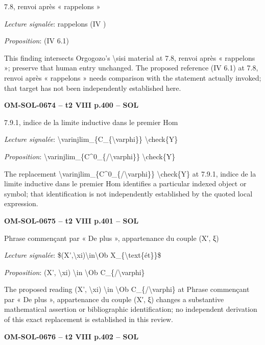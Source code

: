 7.8, renvoi après « rappelons »\par
\emph{Lecture signalée}: rappelons (IV )\par
\emph{Proposition}: (IV 6.1)\par
This finding intersects Orgogozo's \textbackslash{}sisi material at 7.8, renvoi après « rappelons »; preserve that human entry unchanged. The proposed reference (IV 6.1) at 7.8, renvoi après « rappelons » needs comparison with the statement actually invoked; that target has not been independently established here.\par
\par\noindent\textbf{OM-SOL-0674 -- t2 VIII p.400 -- SOL}\par
7.9.1, indice de la limite inductive dans le premier Hom\par
\emph{Lecture signalée}: \textbackslash{}varinjlim\_\{C\_\{\textbackslash{}varphi\}\} \textbackslash{}check\{Y\}\par
\emph{Proposition}: \textbackslash{}varinjlim\_\{C\textasciicircum{}0\_\{/\textbackslash{}varphi\}\} \textbackslash{}check\{Y\}\par
The replacement \textbackslash{}varinjlim\_\{C\textasciicircum{}0\_\{/\textbackslash{}varphi\}\} \textbackslash{}check\{Y\} at 7.9.1, indice de la limite inductive dans le premier Hom identifies a particular indexed object or symbol; that identification is not independently established by the quoted local expression.\par
\par\noindent\textbf{OM-SOL-0675 -- t2 VIII p.401 -- SOL}\par
Phrase commençant par « De plus », appartenance du couple (X′, ξ)\par
\emph{Lecture signalée}: \$(X',\textbackslash{}xi)\textbackslash{}in\textbackslash{}Ob X\_\{\textbackslash{}text\{ét\}\}\$\par
\emph{Proposition}: (X', \textbackslash{}xi) \textbackslash{}in \textbackslash{}Ob C\_\{/\textbackslash{}varphi\}\par
The proposed reading (X', \textbackslash{}xi) \textbackslash{}in \textbackslash{}Ob C\_\{/\textbackslash{}varphi\} at Phrase commençant par « De plus », appartenance du couple (X′, ξ) changes a substantive mathematical assertion or bibliographic identification; no independent derivation of this exact replacement is established in this review.\par
\par\noindent\textbf{OM-SOL-0676 -- t2 VIII p.402 -- SOL}\par
